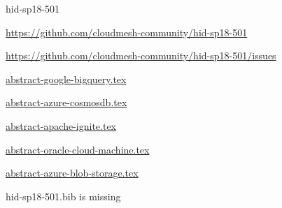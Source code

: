 \begin{IU}

hid-sp18-501

\url{https://github.com/cloudmesh-community/hid-sp18-501}

\url{https://github.com/cloudmesh-community/hid-sp18-501/issues}

\href{https://github.com/cloudmesh-community/hid-sp18-501/blob/master//technology/abstract-google-bigquery.tex}{abstract-google-bigquery.tex}

\href{https://github.com/cloudmesh-community/hid-sp18-501/blob/master//technology/abstract-azure-cosmosdb.tex}{abstract-azure-cosmosdb.tex}

\href{https://github.com/cloudmesh-community/hid-sp18-501/blob/master//technology/abstract-apache-ignite.tex}{abstract-apache-ignite.tex}

\href{https://github.com/cloudmesh-community/hid-sp18-501/blob/master//technology/abstract-oracle-cloud-machine.tex}{abstract-oracle-cloud-machine.tex}

\href{https://github.com/cloudmesh-community/hid-sp18-501/blob/master//technology/abstract-azure-blob-storage.tex}{abstract-azure-blob-storage.tex}

hid-sp18-501.bib is missing

\end{IU}


